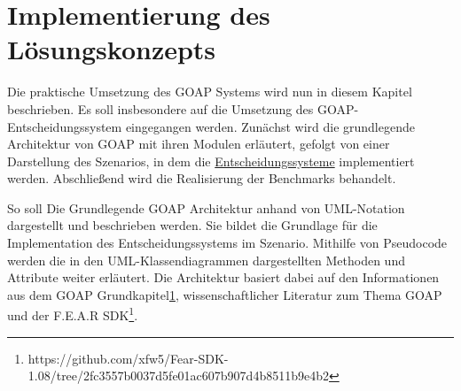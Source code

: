 \usepackage{svg}






\lstset{style=mystyle}


\chapter{Implementierung des Lösungskonzepts}

Die praktische Umsetzung des GOAP Systems wird nun in diesem Kapitel beschrieben. Es soll insbesondere auf die Umsetzung des GOAP-Entscheidungssystem eingegangen werden. Zunächst wird die grundlegende Architektur von GOAP mit ihren Modulen erläutert, gefolgt von einer Darstellung des Szenarios, in dem die \hyperref[chap:entscheidungssysteme]{Entscheidungssysteme} implementiert werden. Abschließend wird die Realisierung der Benchmarks behandelt.

So soll Die Grundlegende GOAP Architektur anhand von UML-Notation dargestellt und beschrieben werden. Sie bildet die Grundlage für die Implementation des Entscheidungssystems im Szenario. Mithilfe von Pseudocode werden die in den UML-Klassendiagrammen dargestellten Methoden und Attribute weiter erläutert. Die Architektur basiert dabei auf den Informationen aus dem GOAP Grundkapitel\ref{}, wissenschaftlicher Literatur zum Thema GOAP und der F.E.A.R SDK\footnote{https://github.com/xfw5/Fear-SDK-1.08/tree/2fc3557b0037d5fe01ac607b907d4b8511b9e4b2}.

